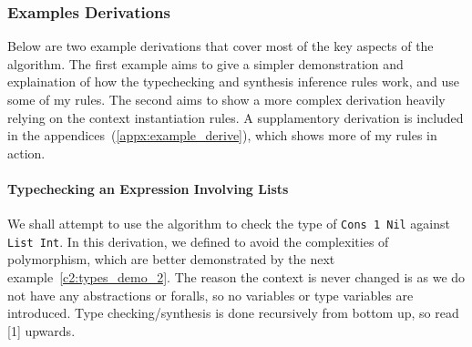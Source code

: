 \subsubsection{Examples Derivations}
Below are two example derivations that cover most of the key aspects of the algorithm. The first example aims to give a simpler demonstration and explaination of how the typechecking and synthesis inference rules work, and use some of my rules. The second aims to show a more complex derivation heavily relying on the context instantiation rules. A supplamentory derivation is included in the appendices~(\ref{appx:example_derive}), which shows more of my rules in action. 

\paragraph{Typechecking an Expression Involving Lists}
\label{c2:types_demo_1}
We shall attempt to use the algorithm to check the type of \lstinline[language=SFL]|Cons 1 Nil| against \lstinline[language=SFL]|List Int|. In this derivation, we defined  to avoid the complexities of polymorphism, which are better demonstrated by the next example~\ref{c2:types_demo_2}. The reason the context is never changed is as we do not have any abstractions or foralls, so no variables or type variables are introduced. Type checking/synthesis is done recursively from bottom up, so read [1] upwards. 

